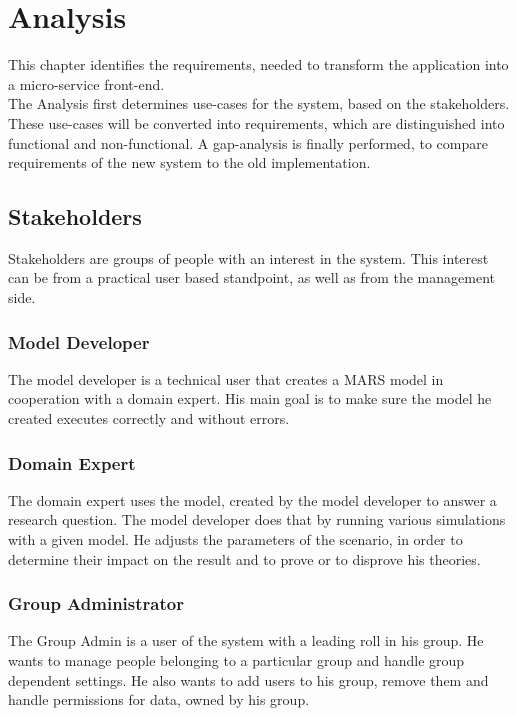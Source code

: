 
\chapter{Analysis}
This chapter identifies the requirements, needed to transform the application into a micro-service front-end.\\
The Analysis first determines use-cases for the system, based on the stakeholders. These use-cases will be converted into requirements, which are distinguished into functional and non-functional. A gap-analysis is finally performed, to compare requirements of the new system to the old implementation. 


\section{Stakeholders}
Stakeholders are groups of people with an interest in the system. This interest can be from a practical user based standpoint, as well as from the management side.

\subsection{Model Developer}
The model developer is a technical user that creates a MARS model in cooperation with a domain expert. His main goal is to make sure the model he created executes correctly and without errors.

\subsection{Domain Expert}
The domain expert uses the model, created by the model developer to answer a research question. The model developer does that by running various simulations with a given model. He adjusts the parameters of the scenario, in order to determine their impact on the result and to prove or to disprove his theories.

\subsection{Group Administrator}
The Group Admin is a user of the system with a leading roll in his group. He wants to manage people belonging to a particular group and handle group dependent settings. He also wants to add users to his group, remove them and handle permissions for data, owned by his group.

